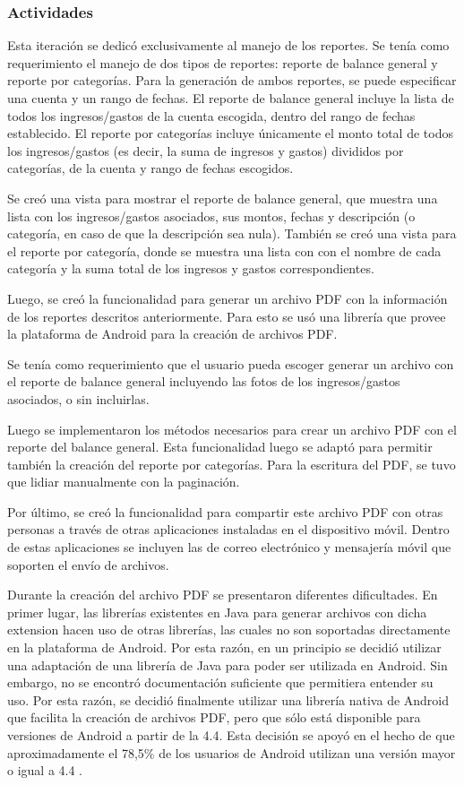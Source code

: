 \subsubsection{Actividades}
Esta iteración se dedicó exclusivamente al manejo de los reportes. Se tenía como requerimiento el manejo de dos tipos de reportes: reporte de balance general y reporte por categorías. Para la generación de ambos reportes, se puede especificar una cuenta y un rango de fechas. El reporte de balance general incluye la lista de todos los ingresos/gastos de la cuenta escogida, dentro del rango de fechas establecido. El reporte por categorías incluye únicamente el monto total de todos los ingresos/gastos (es decir, la suma de ingresos y gastos) divididos por categorías, de la cuenta y rango de fechas escogidos.

Se creó una vista para mostrar el reporte de balance general, que muestra una lista con los ingresos/gastos asociados, sus montos, fechas y descripción (o categoría, en caso de que la descripción sea nula). También se creó una vista para el reporte por categoría, donde se muestra una lista con con el nombre de cada categoría y la suma total de los ingresos y gastos correspondientes.

Luego, se creó la funcionalidad para generar un archivo PDF con la información de los reportes descritos anteriormente. Para esto se usó una librería que provee la plataforma de Android para la creación de archivos PDF.  

Se tenía como requerimiento que el usuario pueda escoger generar un archivo con el reporte de balance general incluyendo las fotos de los ingresos/gastos asociados, o sin incluirlas.

Luego se implementaron los métodos necesarios para crear un archivo PDF con el reporte del balance general. Esta funcionalidad luego se adaptó para permitir también la creación del reporte por categorías. Para la escritura del PDF, se tuvo que lidiar manualmente con la paginación. 

Por último, se creó la funcionalidad para compartir este archivo PDF con otras personas a través de otras aplicaciones instaladas en el dispositivo móvil. Dentro de estas aplicaciones se incluyen las de correo electrónico y mensajería móvil que soporten el envío de archivos.

Durante la creación del archivo PDF se presentaron diferentes dificultades. En primer lugar, las librerías existentes en Java para generar archivos con dicha extension hacen uso de otras librerías, las cuales no son soportadas directamente en la plataforma de Android. Por esta razón, en un principio se decidió utilizar una adaptación de una librería de Java para poder ser utilizada en Android. Sin embargo, no se encontró documentación suficiente que permitiera entender su uso. Por esta razón, se decidió finalmente utilizar una librería nativa de Android que facilita la creación de archivos PDF, pero que sólo está disponible para versiones de Android a partir de la 4.4. Esta decisión se apoyó en el hecho de que aproximadamente el 78,5\% de los usuarios de Android utilizan una versión mayor o igual a 4.4 \cite{USG1}. 


